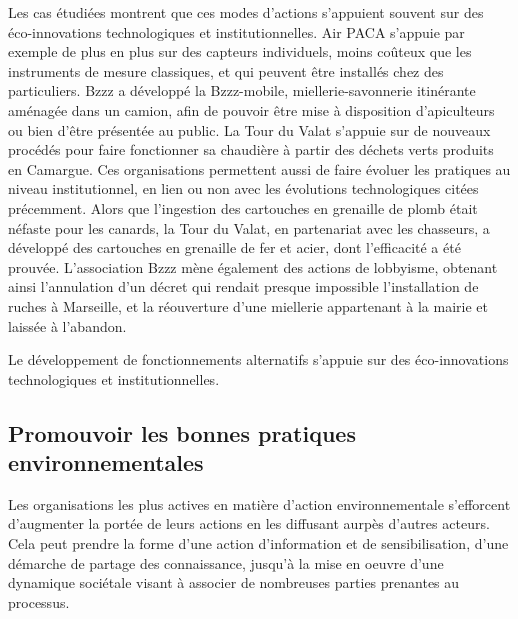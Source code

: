             Les cas étudiées montrent que ces modes d'actions s'appuient souvent sur des éco-innovations technologiques et institutionnelles. Air PACA s'appuie par exemple de plus en plus sur des capteurs individuels, moins coûteux que les instruments de mesure classiques, et qui peuvent être installés chez des particuliers. Bzzz a développé la Bzzz-mobile, miellerie-savonnerie itinérante aménagée dans un camion, afin de pouvoir être mise à disposition d'apiculteurs ou bien d'être présentée au public. La Tour du Valat s'appuie sur de nouveaux procédés pour faire fonctionner sa chaudière à partir des déchets verts produits en Camargue. Ces organisations permettent aussi de faire évoluer les pratiques au niveau institutionnel, en lien ou non avec les évolutions technologiques citées précemment. Alors que l'ingestion des cartouches en grenaille de plomb était néfaste pour les canards, la Tour du Valat, en partenariat avec les chasseurs, a développé des cartouches en grenaille de fer et acier, dont l'efficacité a été prouvée. L'association Bzzz mène également des actions de lobbyisme, obtenant ainsi l'annulation d'un décret qui rendait presque impossible l'installation de ruches à Marseille, et la réouverture d'une miellerie appartenant à la mairie et laissée à l'abandon.
            
            \begin{hyp}
            \label{prop:D}
                Le développement de fonctionnements alternatifs s'appuie sur des éco-innovations technologiques et institutionnelles.
            \end{hyp}

    \subsection{Promouvoir les bonnes pratiques environnementales}
    
       Les organisations les plus actives en matière d'action environnementale s'efforcent d'augmenter la portée de leurs actions en les diffusant aurpès d'autres acteurs. Cela peut prendre la forme d'une action d'information et de sensibilisation, d'une démarche de partage des connaissance, jusqu'à la mise en oeuvre d'une dynamique sociétale visant à associer de nombreuses parties prenantes au processus.
       
